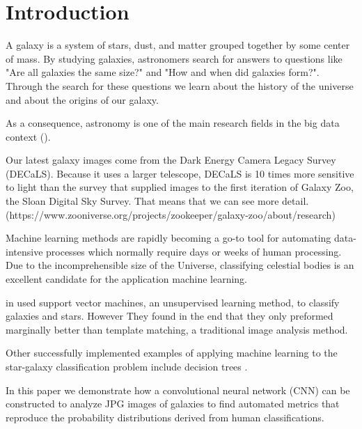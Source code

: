 \section{Introduction}


A galaxy is a system of stars, dust, and matter grouped together by some center of mass. By studying galaxies, astronomers search for answers to questions like "Are all galaxies the same size?" and "How and when did galaxies form?". Through the search for these questions we learn about the history of the universe and about the origins of our galaxy.


As a consequence, astronomy is one of the main research fields in the big data context (\citeauthor{microsoft-galaxies}).


Our latest galaxy images come from the Dark Energy Camera Legacy Survey (DECaLS). Because it uses a larger telescope, DECaLS is 10 times more sensitive to light than the survey that supplied images to the first iteration of Galaxy Zoo, the Sloan Digital Sky Survey. That means that we can see more detail. (https://www.zooniverse.org/projects/zookeeper/galaxy-zoo/about/research)


Machine learning methods are rapidly becoming a go-to tool for automating data-intensive processes which normally require days or weeks of human processing. Due to the incomprehensible size of the Universe, classifying celestial bodies is an excellent candidate for the application machine learning.



\citeauthor{svn-galaxy} in \citeyear{svn-galaxy} used support vector machines, an unsupervised learning method, to classify galaxies and stars. However They found in the end that they only preformed marginally better than template matching, a traditional image analysis method. \cite{svn-galaxy}

Other successfully implemented examples of applying machine learning to the star-galaxy classification problem include decision trees \cite{weir-decision-trees} \cite{ball-decision-trees}.

In this paper we demonstrate how a convolutional neural network (CNN) can be constructed to analyze JPG images of galaxies to find automated metrics that reproduce the probability distributions derived from human classifications.
